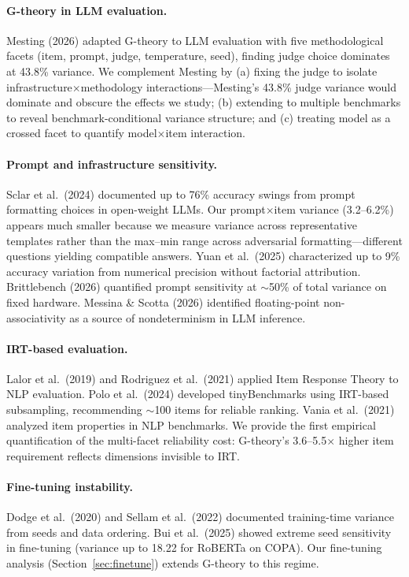 \documentclass[11pt]{article}
\begin{document}
\paragraph{G-theory in LLM evaluation.}
Mesting (2026) adapted G-theory to LLM evaluation with five methodological facets (item, prompt, judge, temperature, seed), finding judge choice dominates at 43.8\% variance.
We complement Mesting by (a) fixing the judge to isolate infrastructure$\times$methodology interactions---Mesting's 43.8\% judge variance would dominate and obscure the effects we study; (b) extending to multiple benchmarks to reveal benchmark-conditional variance structure; and (c) treating model as a crossed facet to quantify model$\times$item interaction.

\paragraph{Prompt and infrastructure sensitivity.}
Sclar et al.\ (2024) documented up to 76\% accuracy swings from prompt formatting choices in open-weight LLMs.
Our prompt$\times$item variance (3.2--6.2\%) appears much smaller because we measure variance across representative templates rather than the max--min range across adversarial formatting---different questions yielding compatible answers.
Yuan et al.\ (2025) characterized up to 9\% accuracy variation from numerical precision without factorial attribution.
Brittlebench (2026) quantified prompt sensitivity at $\sim$50\% of total variance on fixed hardware.
Messina \& Scotta (2026) identified floating-point non-associativity as a source of nondeterminism in LLM inference.

\paragraph{IRT-based evaluation.}
Lalor et al.\ (2019) and Rodriguez et al.\ (2021) applied Item Response Theory to NLP evaluation.
Polo et al.\ (2024) developed tinyBenchmarks using IRT-based subsampling, recommending $\sim$100 items for reliable ranking.
Vania et al.\ (2021) analyzed item properties in NLP benchmarks.
We provide the first empirical quantification of the multi-facet reliability cost: G-theory's 3.6--5.5$\times$ higher item requirement reflects dimensions invisible to IRT.

\paragraph{Fine-tuning instability.}
Dodge et al.\ (2020) and Sellam et al.\ (2022) documented training-time variance from seeds and data ordering.
Bui et al.\ (2025) showed extreme seed sensitivity in fine-tuning (variance up to 18.22 for RoBERTa on COPA).
Our fine-tuning analysis (Section~\ref{sec:finetune}) extends G-theory to this regime.
\end{document}
